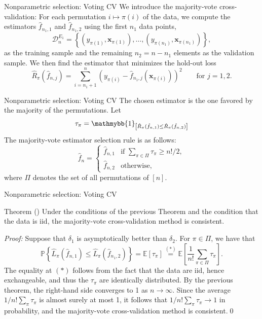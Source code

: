 \documentclass{beamer}
\newcommand{\0}{\emptyset}
\newcommand{\prob}{\mathbb{P}}
\newcommand{\Ep}[1]{\mathbb{E}\left[ #1 \right]}
\newcommand{\paren}[1]{\left(#1 \right)}
\newcommand{\sqbr}[1]{\left[#1 \right]}
\newcommand{\set}[1]{\left\{ #1 \right\}}
\newcommand{\ind}[1]{\mathmybb{1}_{\sqbr{#1}}}
\newcommand{\data}{\mathcal{D}_{n}}
\newcommand{\x}{\boldsymbol{x}}
\newcommand{\fhat}[2]{\hat{f}_{#1, #2}}
\newcommand{\1}{\mathmybb{1}}
\begin{document}
\begin{frame}{Nonparametric selection: Voting CV}
   We introduce the \alert{majority-vote cross-validation}: For each permutation \(i\mapsto\pi(i)\) of the data, we compute the estimators \(\fhat{n_{1}}{1}\) and \(\fhat{n_{1}}{2}\) using the first \(n_{1}\) data points,
  \[\data^{E_{1}} = \set{\paren{y_{\pi(1)}, \x_{\pi(1)}}, \ldots,\paren{y_{\pi(n_1)}, \x_{\pi(n_1)}}},\]
  as the training sample and the remaining \(n_{2}=n-n_{1}\) elements as the validation sample. We then find the estimator that minimizes the hold-out loss
  \[\hat{R}_{\pi}(\fhat{n}{j}) = \sum_{i=n_{1}+1}^{n}\paren{y_{\pi(i)} - \fhat{n_{1}}{j}\paren{\x_{\pi(i)}}}^{2}\qquad \text{for }j=1,2.\]
\end{frame}

\begin{frame}{Nonparametric selection: Voting CV}
  The chosen estimator is the one favored by the majority of the permutations.
  Let 
  \[\tau_{\pi} = \ind{\hat{R}_{\pi}(\fhat{n}{1}) \leq \hat{R}_{\pi}(\fhat{n}{2})}\]
  The majority-vote estimator selection rule is as follows:
  \[\hat{f}_{n} = \begin{cases}
      \fhat{n}{1} &\text{if }\sum_{\pi\in\Pi}\tau_{\pi} \geq {n!}/{2},\\[2mm]
      \fhat{n}{2} &\text{otherwise,}
  \end{cases}\]
  where \(\Pi\) denotes the set of all permutations of \([n]\).
\end{frame}

\begin{frame}{Nonparametric selection: Voting CV}
  \begin{block}{Theorem (\cite{yang_2007})}
    Under the conditions of the previous Theorem and the condition that the data is iid, the majority-vote cross-validation method is consistent.
  \end{block}

  \textit{Proof: }
  Suppose that \(\delta_{1}\) is asymptotically better than \(\delta_{2}\). For \(\pi\in \Pi\), we have that
  \[\prob\set{\hat{L}_{\pi}\paren{\fhat{n}{1}} \leq \hat{L}_{\pi}\paren{\fhat{n_{1}}{2}}} = \Ep{\tau_{\pi}} \stackrel{(*)}{=} \Ep{\frac{1}{n!}\sum_{\pi\in\Pi}\tau_{\pi}}.\]
  The equality at \((*)\) follows from the fact that the data are iid, hence exchangeable, and thus the \(\tau_\pi\) are identically distributed. By the previous theorem, the right-hand side converges to 1 as \(n\to\infty\). Since the average \(1/n! \sum_{\pi}\tau_{\pi}\) is almost surely at most 1, it follows that \(1/n! \sum_{\pi}\tau_{\pi} \to 1\) in probability, and the majority-vote cross-validation method is consistent.\qed{}
\end{frame}
\end{document}
